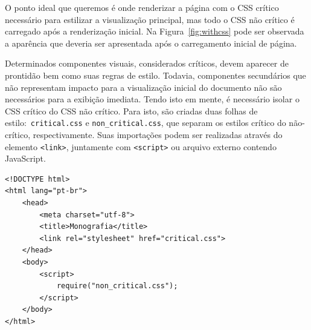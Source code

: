 O ponto ideal que queremos é onde renderizar a página com o CSS crítico necessário para estilizar a visualização principal, mas todo o CSS não crítico é carregado após a renderização inicial. Na Figura~\ref{fig:withcss} pode ser observada a aparência que deveria ser apresentada após o carregamento inicial de página.

\begin{figure}[th]
\end{figure}

Determinados componentes visuais, considerados críticos, devem aparecer de prontidão bem como suas regras de estilo. Todavia, componentes secundários que não representam impacto para a visualização inicial do documento não são necessários para a exibição imediata. Tendo isto em mente, é necessário isolar o CSS crítico do CSS não crítico. Para isto, são criadas duas folhas de estilo:~\texttt{critical.css} e \texttt{non\_critical.css}, que separam os estilos crítico do não-crítico, respectivamente. Suas importações podem ser realizadas através do elemento \texttt{<link>}, juntamente com \texttt{<script>} ou arquivo externo contendo JavaScript.

\begin{lstlisting}[label=criticalcss,caption=CSS Crítico.]
<!DOCTYPE html>
<html lang="pt-br">
    <head>
        <meta charset="utf-8">
        <title>Monografia</title>
        <link rel="stylesheet" href="critical.css">
    </head>
    <body>
        <script>
            require("non_critical.css");
        </script>
    </body>
</html>
\end{lstlisting}

